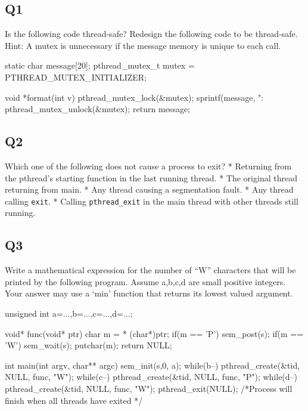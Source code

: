 \subsection{Q1}\label{q1}

Is the following code thread-safe? Redesign the following code to be thread-safe. Hint: A mutex is unnecessary if the message memory is unique to each call.

\begin{code}[language=C]
static char message[20];
pthread_mutex_t mutex = PTHREAD_MUTEX_INITIALIZER;

void *format(int v) {
  pthread_mutex_lock(&mutex);
  sprintf(message, ":%
  pthread_mutex_unlock(&mutex);
  return message;
}
\end{code}

\subsection{Q2}\label{q2}

Which one of the following does not cause a process to exit? * Returning from the pthread's starting function in the last running thread. * The original thread returning from main. * Any thread causing a segmentation fault. * Any thread calling \texttt{exit}. * Calling \texttt{pthread\_exit} in the main thread with other threads still running.

\subsection{Q3}\label{q3}

Write a mathematical expression for the number of ``W'' characters that will be printed by the following program. Assume a,b,c,d are small positive integers. Your answer may use a `min' function that returns its lowest valued argument.

\begin{code}[language=C]
unsigned int a=...,b=...,c=...,d=...;

void* func(void* ptr) {
  char m = * (char*)ptr;
  if(m == 'P') sem_post(s);
  if(m == 'W') sem_wait(s);
  putchar(m);
  return NULL;
}

int main(int argv, char** argc) {
  sem_init(s,0, a);
  while(b--) pthread_create(&tid, NULL, func, "W"); 
  while(c--) pthread_create(&tid, NULL, func, "P"); 
  while(d--) pthread_create(&tid, NULL, func, "W"); 
  pthread_exit(NULL); 
  /*Process will finish when all threads have exited */
}
\end{code}

